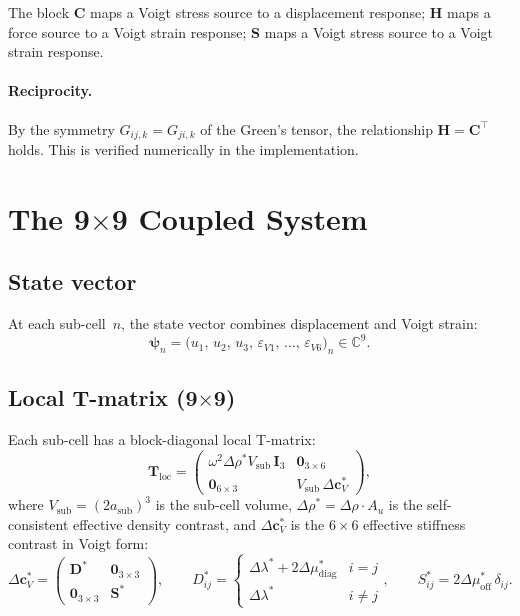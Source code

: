 \documentclass[11pt,a4paper]{article}
\newcommand{\bI}{\mathbf{I}}
\newcommand{\bT}{\mathbf{T}}
\newcommand{\bS}{\mathbf{S}}
\newcommand{\Dlam}{\Delta\lambda}
\newcommand{\Dmu}{\Delta\mu}
\newcommand{\Drho}{\Delta\rho}
\newcommand{\bC}{\mathbf{C}}
\newcommand{\bH}{\mathbf{H}}
\newcommand{\bpsi}{\boldsymbol{\psi}}
\begin{document}
The block $\bC$ maps a Voigt stress source to a displacement
response; $\bH$ maps a force source to a Voigt strain response;
$\bS$ maps a Voigt stress source to a Voigt strain response.

\paragraph{Reciprocity.}
By the symmetry $G_{ij,k} = G_{ji,k}$ of the Green's tensor, the
relationship $\bH = \bC^\top$ holds.  This is verified numerically
in the implementation.

\section{The 9\texorpdfstring{$\times$}{x}9 Coupled System}
\label{sec:coupled}

\subsection{State vector}

At each sub-cell~$n$, the state vector combines displacement and
Voigt strain:
\begin{equation}
  \bpsi_n
  = \bigl(u_1,\,u_2,\,u_3,\,
    \varepsilon_{V1},\,\ldots,\,\varepsilon_{V6}\bigr)_n
  \in \mathbb{C}^9.
  \label{eq:state}
\end{equation}

\subsection{Local T-matrix (9\texorpdfstring{$\times$}{x}9)}

Each sub-cell has a block-diagonal local T-matrix:
\begin{equation}
  \boxed{
  \bT_\text{loc}
  = \begin{pmatrix}
      \omega^2 \Drho^* V_\text{sub}\,\bI_3 & \mathbf{0}_{3 \times 6} \\[4pt]
      \mathbf{0}_{6 \times 3} & V_\text{sub}\,\Delta\mathbf{c}^*_V
    \end{pmatrix},
  }
  \label{eq:Tloc}
\end{equation}
where $V_\text{sub} = (2a_\text{sub})^3$ is the sub-cell volume,
$\Drho^* = \Drho \cdot A_u$ is the self-consistent effective density
contrast, and $\Delta\mathbf{c}^*_V$ is the $6 \times 6$ effective
stiffness contrast in Voigt form:
\begin{equation}
  \Delta\mathbf{c}^*_V
  = \begin{pmatrix}
      \mathbf{D}^* & \mathbf{0}_{3 \times 3} \\
      \mathbf{0}_{3 \times 3} & \mathbf{S}^*
    \end{pmatrix},
  \qquad
  D^*_{ij} = \begin{cases}
    \Dlam^* + 2\Dmu^*_\text{diag} & i = j \\
    \Dlam^* & i \neq j
  \end{cases},
  \qquad
  S^*_{ij} = 2\Dmu^*_\text{off}\,\delta_{ij}.
  \label{eq:Dcstar}
\end{equation}
\end{document}
